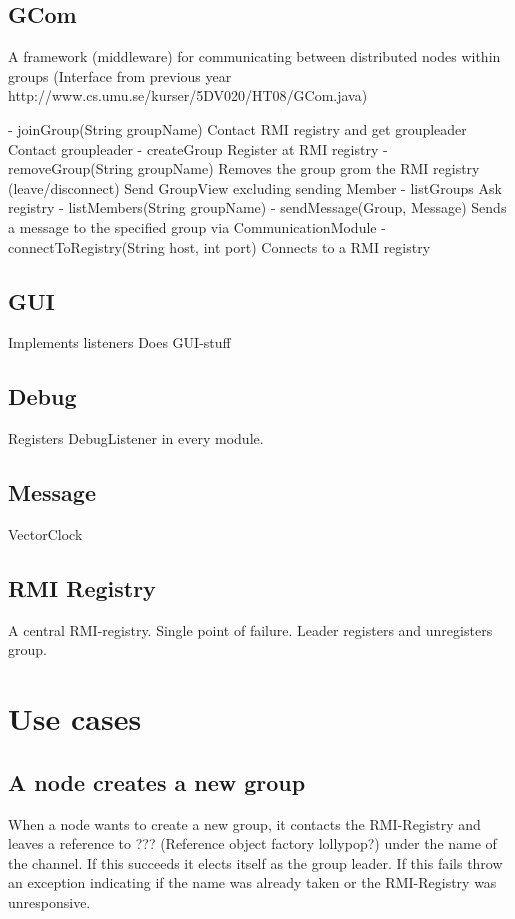\documentclass[11pt,swedish]{article}
\begin{document}
\subsection{GCom}
A framework (middleware) for communicating between distributed nodes within groups
	(Interface from previous year http://www.cs.umu.se/kurser/5DV020/HT08/GCom.java)

- joinGroup(String groupName)
	Contact RMI registry and get groupleader
	Contact groupleader
- createGroup
	Register at RMI registry
- removeGroup(String groupName)
	Removes the group grom the RMI registry
(leave/disconnect)
	Send GroupView excluding sending Member
- listGroups
	Ask registry
- listMembers(String groupName)
- sendMessage(Group, Message)
	Sends a message to the specified group via CommunicationModule
- connectToRegistry(String host, int port)
	Connects to a RMI registry


\subsection{GUI}
	Implements listeners
	Does GUI-stuff

\subsection{Debug}
Registers DebugListener in every module.

\subsection{Message}
	VectorClock

\subsection{RMI Registry}
A central RMI-registry. Single point of failure. Leader registers and unregisters group. 

\section{Use cases}

\subsection{A node creates a new group}
When a node wants to create a new group, it contacts the RMI-Registry and leaves a reference to ??? (Reference object factory lollypop?) under the name of the channel. If this succeeds it elects itself as the group leader. If this fails throw an exception indicating if the name was already taken or the RMI-Registry was unresponsive.
\end{document}

